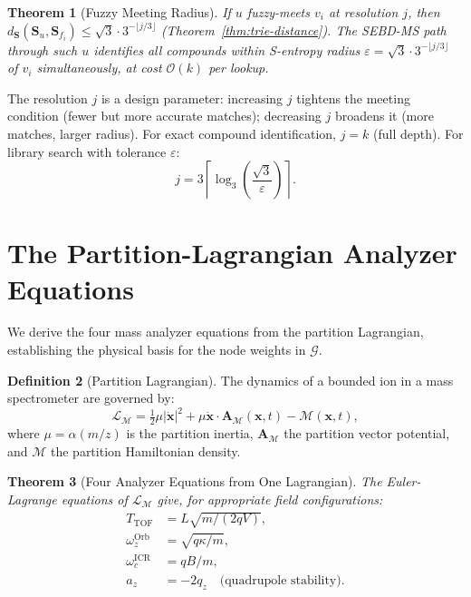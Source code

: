 \documentclass[twocolumn,10pt,a4paper]{article}
\theoremstyle{thmstyle}
\newtheorem{theorem}{Theorem}[section]
\theoremstyle{definition}
\newtheorem{definition}[theorem]{Definition}
\theoremstyle{remark}
\newcommand{\Sv}{\mathbf{S}}
\newcommand{\LM}{\mathcal{L}_{\mathcal{M}}}
\newcommand{\AM}{\mathbf{A}_{\mathcal{M}}}
\newcommand{\Mop}{\mathcal{M}}
\newcommand{\calG}{\mathcal{G}}
\begin{document}
\begin{theorem}[Fuzzy Meeting Radius]
\label{thm:fuzzy-radius}
If $u$ fuzzy-meets $v_i$ at resolution $j$, then
$d_{\Sv}(\Sv_u, \Sv_{f_i}) \leq \sqrt{3} \cdot 3^{-\lfloor j/3 \rfloor}$
(Theorem~\ref{thm:trie-distance}). The SEBD-MS path through such
$u$ identifies all compounds within S-entropy radius
$\varepsilon = \sqrt{3} \cdot 3^{-\lfloor j/3\rfloor}$ of $v_i$
simultaneously, at cost $\mathcal{O}(k)$ per lookup.
\end{theorem}

The resolution $j$ is a design parameter: increasing $j$ tightens the
meeting condition (fewer but more accurate matches); decreasing $j$
broadens it (more matches, larger radius). For exact compound
identification, $j = k$ (full depth). For library search
with tolerance $\varepsilon$:
\begin{equation}
j = 3\left\lceil\log_3\!\left(\frac{\sqrt{3}}{\varepsilon}\right)\right\rceil.
\label{eq:j-from-epsilon}
\end{equation}

\section{The Partition-Lagrangian Analyzer Equations}
\label{sec:lagrangian}

We derive the four mass analyzer equations from the partition Lagrangian,
establishing the physical basis for the node weights in $\calG$.

\begin{definition}[Partition Lagrangian]
The dynamics of a bounded ion in a mass spectrometer are governed by:
\begin{equation}
\LM = \tfrac{1}{2}\mu|\dot{\mathbf{x}}|^2
+ \mu\dot{\mathbf{x}}\cdot\AM(\mathbf{x},t) - \Mop(\mathbf{x},t),
\label{eq:lagrangian}
\end{equation}
where $\mu = \alpha(m/z)$ is the partition inertia, $\AM$ the partition
vector potential, and $\Mop$ the partition Hamiltonian density.
\end{definition}

\begin{theorem}[Four Analyzer Equations from One Lagrangian]
\label{thm:analyzers}
The Euler-Lagrange equations of $\LM$ give, for appropriate field
configurations:
\begin{align}
T_\mathrm{TOF}      &= L\sqrt{m/(2qV)},
\label{eq:tof}\\
\omega_z^\mathrm{Orb} &= \sqrt{q\kappa/m},
\label{eq:orb}\\
\omega_c^\mathrm{ICR} &= qB/m,
\label{eq:icr}\\
a_z                 &= -2q_z \quad \text{(quadrupole stability)}.
\label{eq:quad}
\end{align}
\end{theorem}
\end{document}
